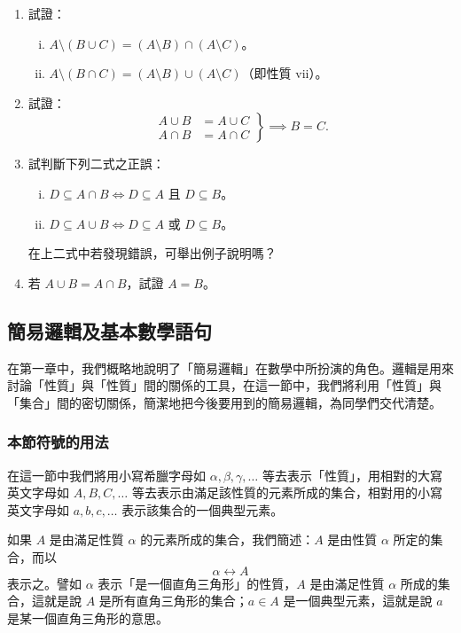 \begin{enumerate}[1., leftmargin=2em]
  \item[*] 試證：
  \begin{enumerate}[(i)]
    \item $A \setminus (B \cup C) = (A \setminus B) \cap (A \setminus C)$。
    \item $A \setminus (B \cap C) = (A \setminus B) \cup (A \setminus C)$（即性質 vii）。
  \end{enumerate}
  \item 試證：
  \begin{equation*}
    \left.
    \begin{aligned}
      A \cup B &= A \cup C \\
      A \cap B &= A \cap C
    \end{aligned}
    \right\} \implies B = C.
  \end{equation*}
  \item 試判斷下列二式之正誤：
  \begin{enumerate}[(i)]
    \item $D \subseteq A \cap B \iff D \subseteq A$ 且 $D \subseteq B$。
    \item $D \subseteq A \cup B \iff D \subseteq A$ 或 $D \subseteq B$。
  \end{enumerate}
  在上二式中若發現錯誤，可舉出例子說明嗎？
  \item 若 $A \cup B = A \cap B$，試證 $A = B$。
\end{enumerate}

\subsection{簡易邏輯及基本數學語句}\label{sec:2-4}

在第一章中，我們概略地說明了「簡易邏輯」在數學中所扮演的角色。邏輯是用來討論「性質」與「性質」間的關係的工具，在這一節中，我們將利用「性質」與「集合」間的密切關係，簡潔地把今後要用到的簡易邏輯，為同學們交代清楚。

\subsubsection*{本節符號的用法}\label{subsec:2-4-notation}

在這一節中我們將用小寫希臘字母如 $\alpha, \beta, \gamma, \dots$ 等去表示「性質」，用相對的大寫英文字母如 $A, B, C, \dots$ 等去表示由滿足該性質的元素所成的集合，相對用的小寫英文字母如 $a, b, c, \dots$ 表示該集合的一個典型元素。

如果 $A$ 是由滿足性質 $\alpha$ 的元素所成的集合，我們簡述：$A$ 是由性質 $\alpha$ 所定的集合，而以
\begin{equation}\label{eq:prop_set_corresp}
  \alpha \longleftrightarrow A
\end{equation}
表示之。譬如 $\alpha$ 表示「是一個直角三角形」的性質，$A$ 是由滿足性質 $\alpha$ 所成的集合，這就是說 $A$ 是所有直角三角形的集合；$a \in A$ 是一個典型元素，這就是說 $a$ 是某一個直角三角形的意思。

